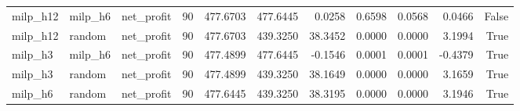 \begin{tabular}{lllrrrrrrrr}
milp_h12 & milp_h6 & net_profit & 90 & 477.6703 & 477.6445 & 0.0258 & 0.6598 & 0.0568 & 0.0466 & False \\
milp_h12 & random & net_profit & 90 & 477.6703 & 439.3250 & 38.3452 & 0.0000 & 0.0000 & 3.1994 & True \\
milp_h3 & milp_h6 & net_profit & 90 & 477.4899 & 477.6445 & -0.1546 & 0.0001 & 0.0001 & -0.4379 & True \\
milp_h3 & random & net_profit & 90 & 477.4899 & 439.3250 & 38.1649 & 0.0000 & 0.0000 & 3.1659 & True \\
milp_h6 & random & net_profit & 90 & 477.6445 & 439.3250 & 38.3195 & 0.0000 & 0.0000 & 3.1946 & True \\
\bottomrule
\end{tabular}
